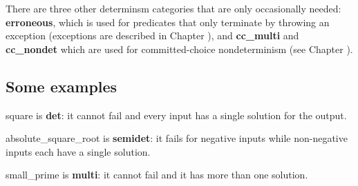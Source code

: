 \documentclass[a4paper,11pt,notitlepage,onecolumn]{book}
\begin{document}
There are three other determinsm categories that are only occasionally
needed: \textsf{\textbf{erroneous}}, which is used for predicates that only terminate by
throwing an exception (exceptions are described in Chapter \XXX{}), and
\textsf{\textbf{cc\_multi}} and \textsf{\textbf{cc\_nondet}} which are used for committed-choice
nondeterminism (see Chapter \XXX{}).

\subsection*{Some examples}

\begin{small}

\begin{ptabular}
\nextline
{}
\nextline
\end{ptabular}

\end{small}
\textsf{square} is \textsf{\textbf{det}}: it cannot fail and every input has a single solution for
the output.

\begin{small}

\begin{ptabular}
\nextline
{}
\nextline
{}
\nextline
{}
\nextline
\end{ptabular}

\end{small}
\textsf{absolute\_square\_root} is \textsf{\textbf{semidet}}: it fails for negative inputs while
non-negative inputs each have a single solution.

\begin{small}

\begin{ptabular}
\nextline
{}
\nextline
{}
\nextline
{}
\nextline
{}
\nextline
\end{ptabular}

\end{small}
\textsf{small\_prime} is \textsf{\textbf{multi}}: it cannot fail and it has more than one solution.
\end{document}
